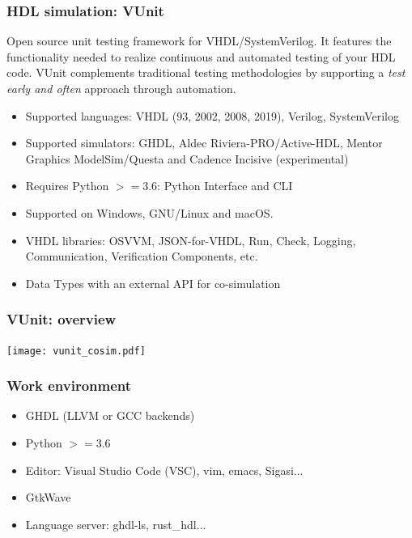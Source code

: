 \documentclass{beamer}
\begin{document}
\begin{frame}
\frametitle{HDL simulation: VUnit}
\small
Open source unit testing framework for VHDL/SystemVerilog. It features the functionality needed to realize continuous and automated testing of your HDL code. VUnit complements traditional testing methodologies by supporting a \emph{test early and often} approach through automation.
\vspace{1em}
\begin{itemize}
  \item Supported languages: VHDL (93, 2002, 2008, 2019), Verilog, SystemVerilog
  \item Supported simulators: GHDL, Aldec Riviera-PRO/Active-HDL, Mentor Graphics ModelSim/Questa and Cadence Incisive (experimental)
  \item Requires Python $>=3.6$: Python Interface and CLI
  \item Supported on Windows, GNU/Linux and macOS.
  \item VHDL libraries: OSVVM, JSON-for-VHDL, Run, Check, Logging, Communication, Verification Components, etc.
  \item Data Types with an external API for co-simulation
\end{itemize}
\end{frame}

\begin{frame}
\frametitle{VUnit: overview}
\centering
\texttt{[image: vunit\_cosim.pdf]}
\end{frame}

\begin{frame}
\frametitle{Work environment}
\begin{itemize}
  \item GHDL (LLVM or GCC backends)
  \vspace{1em}

  \item Python $>=3.6$
  \vspace{1em}

  \item Editor: Visual Studio Code (VSC), vim, emacs, Sigasi...
  \vspace{1em}

  \item GtkWave
  \vspace{1em}

  \item Language server: ghdl-ls, rust\_hdl...
\end{itemize}
\end{frame}
\end{document}
